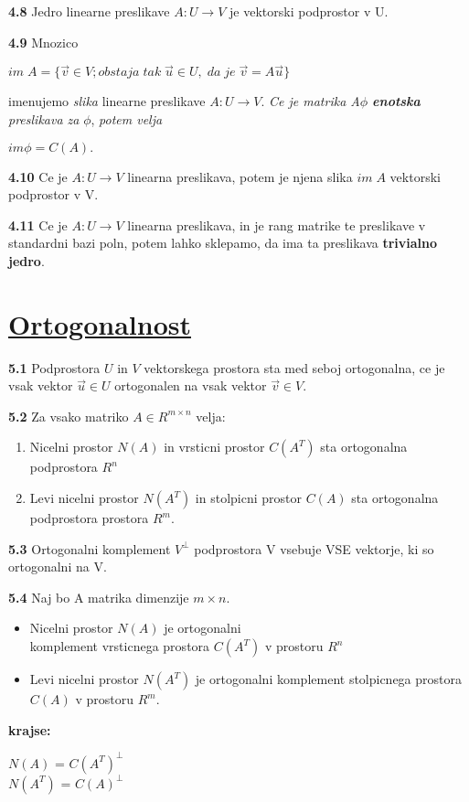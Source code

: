 \documentclass{article}
\begin{document}
\begin{multicols}{3}
\textbf{4.8} Jedro linearne preslikave $A: U \rightarrow V$ je vektorski podprostor v U.

\textbf{4.9} Mnozico
\begin{center}
    $im\; A = \{ \vec{v} \in V; obstaja\; tak\; \vec{u} \in U,\; da\; je\; \vec{v} = A\vec{u} \}$
\end{center}
imenujemo \textit{slika} linearne preslikave $A: U \rightarrow V$.
\textit{Ce je matrika A$\phi$ \textbf{enotska} preslikava za } $\phi$, \textit{potem velja}
\begin{center}
    \begin{math}
        im \phi = C(A).
    \end{math}
\end{center}

\textbf{4.10} Ce je $A: U \rightarrow V$ linearna preslikava, potem je njena slika $im\; A$
vektorski podprostor v V.

\textbf{4.11} Ce je $A: U \rightarrow V$ linearna preslikava, in je rang matrike te preslikave v standardni bazi poln,
potem lahko sklepamo, da ima  ta preslikava \textbf{trivialno jedro}.


\section{\underline{Ortogonalnost}}

\textbf{5.1} Podprostora $U$ in $V$ vektorskega prostora sta med seboj ortogonalna,
ce je vsak vektor $\vec{u} \in U$ ortogonalen na vsak vektor $\vec{v} \in V$.

\textbf{5.2} Za vsako matriko $A \in R^{m \times n}$ velja:
\begin{enumerate}
    \item Nicelni prostor $N(A)$ in vrsticni prostor $C(A^{T})$ sta ortogonalna podprostora $R^{n}$
    \item Levi nicelni prostor $N(A^{T})$ in stolpicni prostor $C(A)$ sta ortogonalna podprostora prostora $R^{m}$.
\end{enumerate}

\textbf{5.3} Ortogonalni komplement $V^{\perp}$ podprostora V vsebuje VSE vektorje, ki so ortogonalni na V.

\textbf{5.4} Naj bo A matrika dimenzije $m \times n$.
\begin{itemize}
    \item Nicelni prostor $N(A)$ je ortogonalni\\ komplement vrsticnega prostora $C(A^{T})$ v prostoru $R^{n}$
    \item Levi nicelni prostor $N(A^{T})$ je ortogonalni komplement stolpicnega prostora $C(A)$ v prostoru $R^{m}$.
\end{itemize}
\textbf{krajse:}
\begin{center}
    $N(A)$ = $C(A^{T})^{\perp}$\\
    $N(A^{T})$ = $C(A)^{\perp}$ 
\end{center}


\end{multicols}
\end{document}
